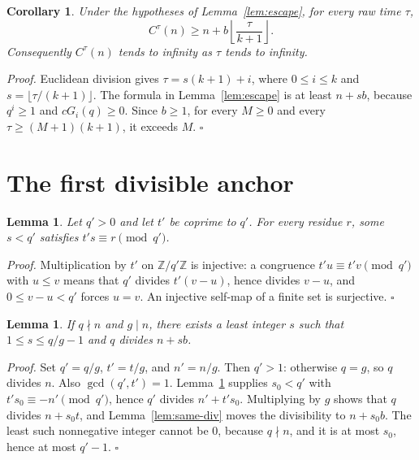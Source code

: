 \documentclass[11pt,letterpaper]{article}
\newcommand{\Z}{\mathbb{Z}}
\newtheorem{lemma}[theorem]{Lemma}
\newtheorem{corollary}[theorem]{Corollary}
\newenvironment{proof}{\noindent\textit{Proof.}}{\hfill\(\square\)}
\begin{document}
\begin{corollary}
\label{cor:all-clock}
Under the hypotheses of Lemma~\ref{lem:escape}, for every raw time \(\tau\),
\[
C^\tau(n)\ge n+b\left\lfloor\frac{\tau}{k+1}\right\rfloor.
\]
Consequently \(C^\tau(n)\) tends to infinity as \(\tau\) tends to infinity.
\end{corollary}

\begin{proof}
Euclidean division gives \(\tau=s(k+1)+i\), where \(0\le i\le k\) and
\(s=\lfloor\tau/(k+1)\rfloor\). The formula in Lemma~\ref{lem:escape} is
at least \(n+sb\), because \(q^i\ge1\) and \(cG_i(q)\ge0\). Since \(b\ge1\),
for every \(M\ge0\) and every \(\tau\ge(M+1)(k+1)\), it exceeds \(M\).
\end{proof}

\section{The first divisible anchor}

\begin{lemma}
\label{lem:cover}
Let \(q'>0\) and let \(t'\) be coprime to \(q'\). For every residue \(r\), some \(s<q'\) satisfies \(t's\equiv r\pmod{q'}\).
\end{lemma}

\begin{proof}
Multiplication by \(t'\) on \(\Z/q'\Z\) is injective: a congruence \(t'u\equiv t'v\pmod{q'}\) with \(u\le v\) means that \(q'\) divides \(t'(v-u)\), hence divides \(v-u\), and \(0\le v-u<q'\) forces \(u=v\). An injective self-map of a finite set is surjective.
\end{proof}

\begin{lemma}
\label{lem:delay}
If \(q\nmid n\) and \(g\mid n\), there exists a least integer \(s\) such that \(1\le s\le q/g-1\) and \(q\) divides \(n+sb\).
\end{lemma}

\begin{proof}
Set \(q'=q/g\), \(t'=t/g\), and \(n'=n/g\). Then \(q'>1\): otherwise \(q=g\), so \(q\) divides \(n\). Also \(\gcd(q',t')=1\). Lemma~\ref{lem:cover} supplies \(s_0<q'\) with \(t's_0\equiv -n'\pmod{q'}\), hence \(q'\) divides \(n'+t's_0\). Multiplying by \(g\) shows that \(q\) divides \(n+s_0t\), and Lemma~\ref{lem:same-div} moves the divisibility to \(n+s_0b\). The least such nonnegative integer cannot be \(0\), because \(q\nmid n\), and it is at most \(s_0\), hence at most \(q'-1\).
\end{proof}
\end{document}
